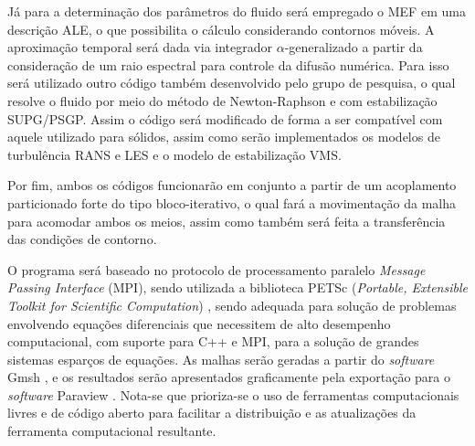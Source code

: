 Já para a determinação dos parâmetros do fluido será empregado o MEF em uma descrição ALE, o que possibilita o cálculo considerando contornos móveis. A aproximação temporal será dada via integrador $\alpha$-generalizado a partir da consideração de um raio espectral para controle da difusão numérica. Para isso será utilizado outro código também desenvolvido pelo grupo de pesquisa, o qual resolve o fluido por meio do método de Newton-Raphson e com estabilização SUPG/PSGP. Assim o código será modificado de forma a ser compatível com aquele utilizado para sólidos, assim como serão implementados os modelos de turbulência RANS e LES e o modelo de estabilização VMS.

Por fim, ambos os códigos funcionarão em conjunto a partir de um acoplamento particionado forte do tipo bloco-iterativo, o qual fará a movimentação da malha para acomodar ambos os meios, assim como também será feita a transferência das condições de contorno.




O programa será baseado no protocolo de processamento paralelo \textit{Message Passing Interface} (MPI), sendo utilizada a biblioteca PETSc (\textit{Portable, Extensible Toolkit for Scientific Computation}) \cite{petsc-web-page}, sendo adequada para solução de problemas envolvendo equações diferenciais que necessitem de alto desempenho computacional, com suporte para C++ e MPI, para a solução de grandes sistemas esparços de equações. As malhas serão geradas a partir do \textit{software} Gmsh \cite{geuzaine2009gmsh}, e os resultados serão apresentados graficamente pela exportação para o \textit{software} Paraview \cite{ahrens2005paraview}. Nota-se que prioriza-se o uso de ferramentas computacionais livres e de código aberto para facilitar a distribuição e as atualizações da ferramenta computacional resultante.

